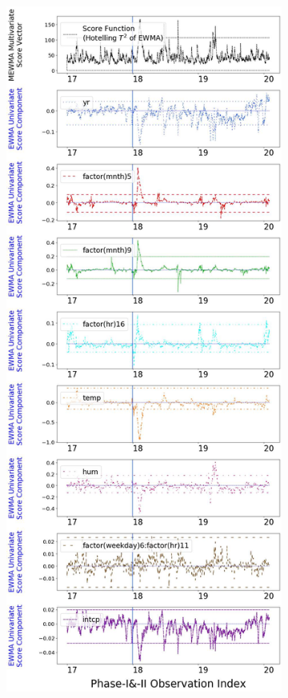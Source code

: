 \documentclass[twoside,11pt]{article}
\begin{document}
\begin{figure}[H]
\begin{subfigure}[t]{0.304\linewidth}
     \captionsetup{width=.95\linewidth}
     \caption{}
     \label{fig:bs_norm_retro_narrow}
\end{subfigure}
\begin{subfigure}[t]{0.374\linewidth}
     \centering
         \includegraphics[width=1.0\textwidth, trim=.0in .0in .0in .0in, clip]{../figures/v14/bike_sharing/reg_lin_PI_D_2/quadr/Compressed_pos_single_bike_fisher_mlines_with_regu_1e-08_0_0001_0_01_99_99.png}

\end{subfigure}
\end{figure}
\end{document}

